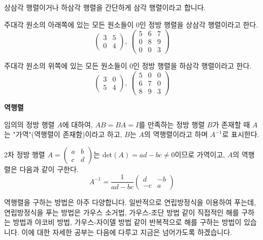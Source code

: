 \begin{flushleft}
    상삼각 행렬이거나 하삼각 행렬을 간단하게 삼각 행렬이라고 합니다.
\end{flushleft}

\begin{tcolorbox}[colback = white, colframe = Definition, title = \textmd{정의: 상삼각 행렬}]
    주대각 원소의 아래쪽에 있는 모든 원소들이 $0$인 정방 행렬을 상삼각 행렬이라고 한다.
    \[ \begin{pmatrix} 3 & 5 \\ 0 & 4 \end{pmatrix}, \ 
    \begin{pmatrix} 5 & 6 & 7 \\ 0 & 8 & 9 \\ 0 & 0 & 3 \end{pmatrix} \]
\end{tcolorbox}
\begin{tcolorbox}[colback = white, colframe = Definition, title = \textmd{정의: 하삼각 행렬}]
    주대각 원소의 위쪽에 있는 모든 원소들이 $0$인 정방 행렬을 하삼각 행렬이라고 한다.
    \[ \begin{pmatrix} 3 & 0 \\ 5 & 4 \end{pmatrix}, \ 
    \begin{pmatrix} 5 & 0 & 0 \\ 6 & 7 & 0 \\ 8 & 9 & 3 \end{pmatrix} \]
\end{tcolorbox}

\newpage
\begin{flushleft}
    {\textcolor{subheader}{{\LARGE\textbf{역행렬}}}}
\end{flushleft}
\begin{tcolorbox}[colback = white, colframe = Definition, title = \textmd{정의: 역행렬}]
    임의의 정방 행렬 $A$에 대하여, $AB = BA = I$를 만족하는 정방 행렬 $B$가 존재할 때 $A$는 "가역"(역행렬이 존재함)이라고 하고, $B$는 $A$의 역행렬이라고 하며 $A^{-1}$로 표시한다.
\end{tcolorbox}
\begin{tcolorbox}[colback = white, colframe = Theorem, title = \textmd{정리: 2차 정방 행렬의 역행렬 }]
    2차 정방 행렬 $A = \begin{pmatrix} a & b\\ c & d  \end{pmatrix}$는 $\text{det}(A) = ad - bc \ne 0$이므로 가역이고, $A$의 역행렬은 다음과 같이 구한다.
    \[ A^{-1} = \frac{1}{ad - bc} \begin{pmatrix} d & -b \\ -c & a \end{pmatrix} \]
\end{tcolorbox}
\begin{flushleft}
    역행렬을 구하는 방법은 아주 다양합니다. 일반적으로 연립방정식을 이용하여 푸는데, 연립방정식을 푸는 방법은 가우스 소거법, 가우스-조단 방법 같이 직접적인 해를 구하는 방법과 야코비 방법, 가우스-자이델 방법 같이 반복적으로 해를 구하는 방법이 있습니다. 
    이에 대한 자세한 공부는 다음에 다루고 지금은 넘어가도록 하겠습니다.
\end{flushleft}

